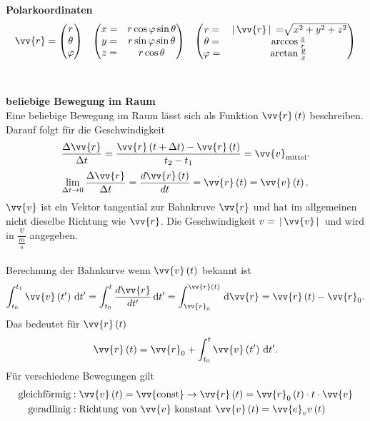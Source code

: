 \documentclass[a4paper,12pt]{article}
\newcommand{\td}{\,\text{d}}
\begin{document}
\\\hfill\\\textbf{Polarkoordinaten}\\ 
\begin{align*}
        \vv{r}=\left(\begin{matrix}
                r\\\theta \\\varphi
                \end{matrix}\right)&&\left(\begin{matrix}
                x=&r\cos \varphi \sin \theta \\
                y=&r\sin \varphi \sin \theta \\
                z=&r\cos \theta 
\end{matrix}\right)&&\left(\begin{matrix}
r=&\,|\, \vv{r}\,|\, =\sqrt[]{x^2+y^2+z^2}\\
\theta =&\arccos \tfrac{z}{r}\\
\varphi =&\arctan \tfrac{y}{x}
\end{matrix}\right)
\end{align*}
\\\hfill\\\textbf{beliebige Bewegung im Raum}\\ 
Eine beliebige Bewegung im Raum lässt sich als Funktion $\vv{r}\left(t\right)$ beschreiben. Darauf folgt für die Geschwindigkeit
\[ 
        \dfrac{\Delta \vv{r}}{\Delta t}=\dfrac{\vv{r}\left(t+\Delta t\right)-\vv{r}\left(t\right)}{t_2-t_1}={\vv{v}_{\text{mittel}} }
.\] 
\[ 
        \lim_{\Delta t\rightarrow 0}\dfrac{\Delta \vv{r}}{\Delta t}=\dfrac{d\vv{r}\left(t\right)}{dt}=\dot{\vv{r}}\left(t\right)=\vv{v}\left(t\right)
.\] 
$\vv{v}$ ist ein Vektor tangential zur Bahnkruve $\vv{r}$ und hat im allgemeinen nicht dieselbe Richtung wie $\vv{r}$. Die Geschwindigkeit $v=\,|\, \vv{v}\,|\, $ und wird in $\dfrac{v}{\tfrac{m}{s}}$ angegeben.\\\\
Berechnung der Bahnkurve wenn $\vv{v}\left(t\right)$ bekannt ist
\[ 
        \int_{t_0}^{t_1}\vv{v}\left(t'\right)\td t'=\int_{t_0}^{t}\dfrac{d\vv{r}}{dt'}\td t'=\int_{\vv{r}_0}^{\vv{r}\left(t\right)}\td\vv{r}=\vv{r}\left(t\right)-\vv{r}_0
.\] 
Das bedeutet für $\vv{r}\left(t\right)$
\[ 
        \vv{r}\left(t\right)=\vv{r}_0+\int_{t_0}^{t}\vv{v}\left(t'\right)\td t'
.\] 
Für verschiedene Bewegungen gilt
\begin{align*}
        \text{gleichförmig}&:\vv{v}\left(t\right)=\vv{\text{const}}\rightarrow \vv{r}\left(t\right)=\vv{r}_0\left(t\right)\cdot t\cdot \vv{v}\\
        \text{geradlinig}&:\text{Richtung von $\vv{v}$ konstant }\vv{v}\left(t\right)=\vv{e}_v v\left(t\right)
\end{align*}
\end{document}
